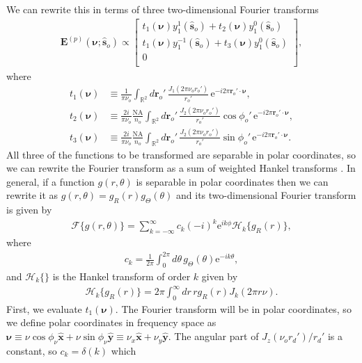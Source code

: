 \documentclass[11pt]{article}
\newcommand{\me}{\mathrm{e}}
\providecommand{\mb}[1]{\mathbf{#1}}
\providecommand{\ro}[1]{\mathbf{\mathbf{r}}_o}
\providecommand{\so}[1]{\mathbf{\hat{s}}_o}
\providecommand{\mh}[1]{\mathbf{\hat{#1}}}
\providecommand{\bs}[1]{\boldsymbol{#1}}
\begin{document}
We can rewrite this in terms of three two-dimensional Fourier transforms
\begin{align}
  \mb{E}^{(p)}(\bs{\nu}; \so{}) \propto 
\begin{bmatrix}
    t_1(\bs{\nu})y_1^1(\so{}) + t_2(\bs{\nu})y_1^0(\so{})\\
    t_1(\bs{\nu})y_1^{-1}(\so{}) + t_3(\bs{\nu})y_1^0(\so{})\\
    0\\
  \end{bmatrix}\label{eq:tint},
\end{align}
where
\begin{align}
  t_1(\bs{\nu}) &\equiv \frac{1}{\pi \nu_o}\int_{\mathbb{R}^2}d\ro{}'\,  \frac{J_1(2\pi \nu_or_o')}{r_o'}\, \me^{-i 2\pi\ro{}'\cdot\bs{\nu}},\\
  t_2(\bs{\nu}) &\equiv \frac{2i}{\pi \nu_o}\frac{\text{NA}}{n_o}\int_{\mathbb{R}^2}d\ro{}'\, \frac{J_2(2\pi \nu_or_o')}{r_o'}\cos\phi_o'\, \me^{-i 2\pi\ro{}'\cdot\bs{\nu}},\\
  t_3(\bs{\nu}) &\equiv \frac{2i}{\pi \nu_o}\frac{\text{NA}}{n_o}\int_{\mathbb{R}^2}d\ro{}'\, \frac{J_2(2\pi \nu_or_o')}{r_o'}\sin\phi_o'\, \me^{-i 2\pi\ro{}'\cdot\bs{\nu}}.
\end{align}
All three of the functions to be transformed are separable in polar coordinates,
so we can rewrite the Fourier transform as a sum of weighted Hankel transforms
\cite{goodman1996}. In general, if a function $g(r, \theta)$ is separable in
polar coordinates then we can rewrite it as
$g(r, \theta) = g_{R}(r)g_{\Theta}(\theta)$ and its two-dimensional Fourier transform
is given by
\begin{align}
  \mathcal{F}\{g(r, \theta)\} = \sum_{k=-\infty}^{\infty}c_k(-i)^k\me^{ik\phi}\mathcal{H}_k\{g_R(r)\},
\end{align}
where
\begin{align}
  c_k = \frac{1}{2\pi}\int_0^{2\pi}d\theta\, g_{\Theta}(\theta)\me^{-ik\theta},
\end{align}
and $\mathcal{H}_k\{\}$ is the Hankel transform of order $k$ given by
\begin{align}
  \mathcal{H}_k\{g_R(r)\} = 2\pi\int_0^{\infty}dr\, r g_R(r)J_k(2\pi r \nu).
\end{align}
First, we evaluate $t_1(\bs{\nu})$. The Fourier transform will be in polar
coordinates, so we define polar coordinates in frequency space as
$\bs{\nu} \equiv \nu\cos\phi_\nu\mh{x} + \nu\sin\phi_\nu\mh{y} \equiv \nu_x\mh{x} + \nu_y\mh{y}$. The
angular part of $J_z(\nu_or_d')/r_d'$ is a constant, so $c_k = \delta(k)$ which
\end{document}
